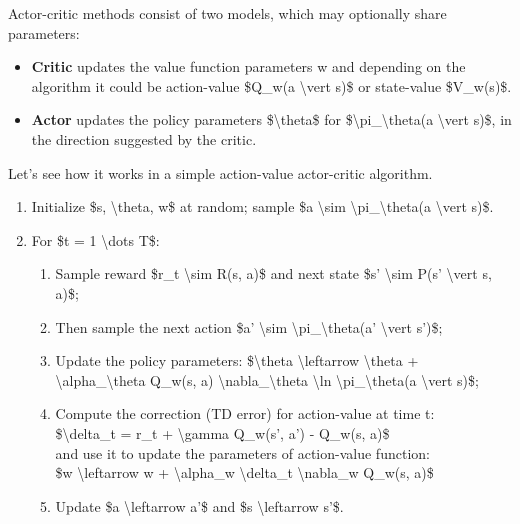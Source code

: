 Actor-critic methods consist of two models, which may optionally share parameters:

\begin{itemize}
\tightlist
\item
  \textbf{Critic} updates the value function parameters w and depending on the algorithm it could be action-value \$Q\_w(a \textbackslash vert s)\$ or state-value \$V\_w(s)\$.
\item
  \textbf{Actor} updates the policy parameters \$\textbackslash theta\$ for \$\textbackslash pi\_\textbackslash theta(a \textbackslash vert s)\$, in the direction suggested by the critic.
\end{itemize}

Let's see how it works in a simple action-value actor-critic algorithm.

\begin{enumerate}
\tightlist
\item
  Initialize \$s, \textbackslash theta, w\$ at random; sample \$a \textbackslash sim \textbackslash pi\_\textbackslash theta(a \textbackslash vert s)\$.
\item
  For \$t = 1 \textbackslash dots T\$:

  \begin{enumerate}
  \tightlist
  \item
    Sample reward \$r\_t \textbackslash sim R(s, a)\$ and next state \$s' \textbackslash sim P(s' \textbackslash vert s, a)\$;
  \item
    Then sample the next action \$a' \textbackslash sim \textbackslash pi\_\textbackslash theta(a' \textbackslash vert s')\$;
  \item
    Update the policy parameters: \$\textbackslash theta \textbackslash leftarrow \textbackslash theta + \textbackslash alpha\_\textbackslash theta Q\_w(s, a) \textbackslash nabla\_\textbackslash theta \textbackslash ln \textbackslash pi\_\textbackslash theta(a \textbackslash vert s)\$;
  \item
    Compute the correction (TD error) for action-value at time t:\\
    \$\textbackslash delta\_t = r\_t + \textbackslash gamma Q\_w(s', a') - Q\_w(s, a)\$\\
    and use it to update the parameters of action-value function:\\
    \$w \textbackslash leftarrow w + \textbackslash alpha\_w \textbackslash delta\_t \textbackslash nabla\_w Q\_w(s, a)\$
  \item
    Update \$a \textbackslash leftarrow a'\$ and \$s \textbackslash leftarrow s'\$.
  \end{enumerate}
\end{enumerate}

